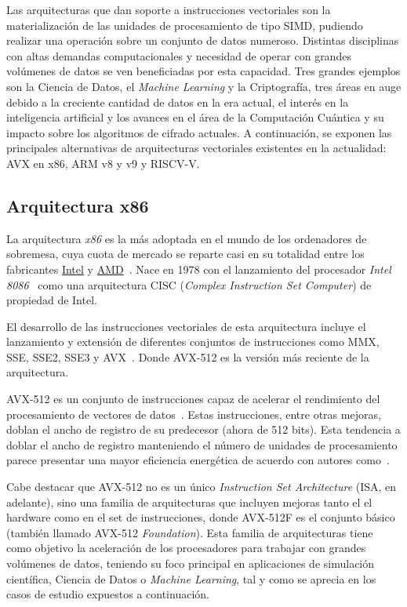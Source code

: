 Las arquitecturas que dan soporte a instrucciones vectoriales son la
materialización de las unidades de procesamiento de tipo SIMD, pudiendo
realizar una operación sobre un conjunto de datos numeroso. Distintas
disciplinas con altas demandas computacionales y necesidad de operar con
grandes volúmenes de datos se ven beneficiadas por esta capacidad. Tres grandes
ejemplos son la Ciencia de Datos, el \textit{Machine Learning} y la Criptografía, tres áreas en
auge debido a la creciente cantidad de datos en la era actual, el interés en
la inteligencia artificial y los avances en el área de la Computación Cuántica y su impacto sobre los algoritmos de cifrado actuales. A continuación, se exponen las principales
alternativas de arquitecturas vectoriales existentes en la actualidad: AVX en
x86, ARM v8 y v9 y RISCV-V.

\subsection{Arquitectura x86}
La arquitectura \textit{x86} es la más adoptada en el mundo de los ordenadores
de sobremesa, cuya cuota de mercado se reparte casi en su totalidad entre los
fabricantes \href{https://www.intel.com}{Intel} y
\href{https://www.amd.com}{AMD}~\cite{tiwari2022amd}. Nace en 1978 con el
lanzamiento del procesador \textit{Intel 8086}~\cite{intel-8086} como una
arquitectura CISC (\textit{Complex Instruction Set Computer}) de propiedad de
Intel.

El desarrollo de las instrucciones vectoriales de esta arquitectura incluye el
lanzamiento y extensión de diferentes conjuntos de instrucciones como MMX, SSE,
SSE2, SSE3 y AVX~\cite{vector_research}. Donde AVX-512 es la versión más
reciente de la arquitectura.

AVX-512 es un conjunto de instrucciones capaz de acelerar el rendimiento del
procesamiento de vectores de datos~\cite{intel-avx512}. Estas instrucciones,
entre otras mejoras, doblan el ancho de registro de su predecesor (ahora de 512
bits). Esta tendencia a doblar el ancho de registro manteniendo el número de
unidades de procesamiento parece presentar una mayor eficiencia energética de
acuerdo con autores como~\cite{hennessy2011computer}.

Cabe destacar que AVX-512 no es un único \textit{Instruction Set Architecture} (ISA, en adelante), sino una familia de arquitecturas
que incluyen mejoras tanto el el hardware como en el set de instrucciones,
donde AVX-512F es el conjunto básico (también llamado AVX-512
\textit{Foundation}). Esta familia de arquitecturas tiene como objetivo la
aceleración de los procesadores para trabajar con grandes volúmenes de datos,
teniendo su foco principal en aplicaciones de simulación científica, Ciencia de
Datos o \textit{Machine Learning}, tal y como se aprecia en los casos de
estudio expuestos a continuación.

